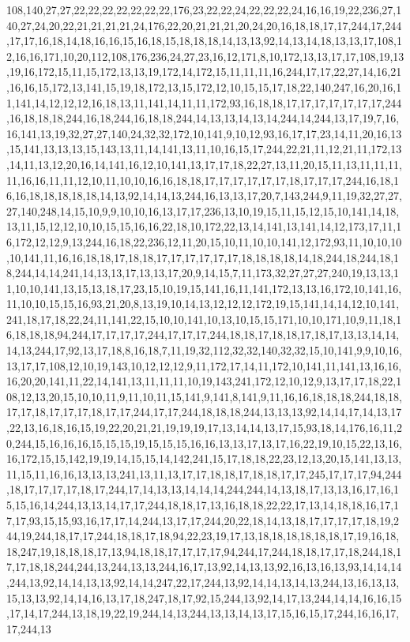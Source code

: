108,140,27,27,22,22,22,22,22,22,22,176,23,22,22,24,22,22,22,24,16,16,19,22,236,27,140,27,24,20,22,21,21,21,21,24,176,22,20,21,21,21,20,24,20,16,18,18,17,17,244,17,244,17,17,16,18,14,18,16,16,15,16,18,15,18,18,18,14,13,13,92,14,13,14,18,13,13,17,108,12,16,16,171,10,20,112,108,176,236,24,27,23,16,12,171,8,10,172,13,13,17,17,108,19,13,19,16,172,15,11,15,172,13,13,19,172,14,172,15,11,11,11,16,244,17,17,22,27,14,16,21,16,16,15,172,13,141,15,19,18,172,13,15,172,12,10,15,15,17,18,22,140,247,16,20,16,11,141,14,12,12,12,16,18,13,11,141,14,11,11,172,93,16,18,18,17,17,17,17,17,17,17,244,16,18,18,18,244,16,18,244,16,18,18,244,14,13,13,14,13,14,244,14,244,13,17,19,7,16,16,141,13,19,32,27,27,140,24,32,32,172,10,141,9,10,12,93,16,17,17,23,14,11,20,16,13,15,141,13,13,13,15,143,13,11,14,141,13,11,10,16,15,17,244,22,21,11,12,21,11,172,13,14,11,13,12,20,16,14,141,16,12,10,141,13,17,17,18,22,27,13,11,20,15,11,13,11,11,11,11,16,16,11,11,12,10,11,10,10,16,16,18,18,17,17,17,17,17,17,18,17,17,17,244,16,18,16,16,18,18,18,18,18,14,13,92,14,14,13,244,16,13,13,17,20,7,143,244,9,11,19,32,27,27,27,140,248,14,15,10,9,9,10,10,16,13,17,17,236,13,10,19,15,11,15,12,15,10,141,14,18,13,11,15,12,12,10,10,15,15,16,16,22,18,10,172,22,13,14,141,13,141,14,12,173,17,11,16,172,12,12,9,13,244,16,18,22,236,12,11,20,15,10,11,10,10,141,12,172,93,11,10,10,10,10,141,11,16,16,18,18,17,18,18,17,17,17,17,17,17,18,18,18,18,14,18,244,18,244,18,18,244,14,14,241,14,13,13,17,13,13,17,20,9,14,15,7,11,173,32,27,27,27,240,19,13,13,11,10,10,141,13,15,13,18,17,23,15,10,19,15,141,16,11,141,172,13,13,16,172,10,141,16,11,10,10,15,15,16,93,21,20,8,13,19,10,14,13,12,12,12,172,19,15,141,14,14,12,10,141,241,18,17,18,22,24,11,141,22,15,10,10,141,10,13,10,15,15,171,10,10,171,10,9,11,18,16,18,18,18,94,244,17,17,17,17,244,17,17,17,244,18,18,17,18,18,17,18,17,13,13,14,14,14,13,244,17,92,13,17,18,8,16,18,7,11,19,32,112,32,32,140,32,32,15,10,141,9,9,10,16,13,17,17,108,12,10,19,143,10,12,12,12,9,11,172,17,14,11,172,10,141,11,141,13,16,16,16,20,20,141,11,22,14,141,13,11,11,11,10,19,143,241,172,12,10,12,9,13,17,17,18,22,108,12,13,20,15,10,10,11,9,11,10,11,15,141,9,141,8,141,9,11,16,16,18,18,18,244,18,18,17,17,18,17,17,17,18,17,17,244,17,17,244,18,18,18,244,13,13,13,92,14,14,17,14,13,17,22,13,16,18,16,15,19,22,20,21,21,19,19,19,17,13,14,14,13,17,15,93,18,14,176,16,11,20,244,15,16,16,16,15,15,15,19,15,15,15,16,16,13,13,17,13,17,16,22,19,10,15,22,13,16,16,172,15,15,142,19,19,14,15,15,14,142,241,15,17,18,18,22,23,12,13,20,15,141,13,13,11,15,11,16,16,13,13,13,241,13,11,13,17,17,18,18,17,18,18,17,17,245,17,17,17,94,244,18,17,17,17,17,18,17,244,17,14,13,13,14,14,14,244,244,14,13,18,17,13,13,16,17,16,15,15,16,14,244,13,13,14,17,17,244,18,18,17,13,16,18,18,22,22,17,13,14,18,18,16,17,17,17,93,15,15,93,16,17,17,14,244,13,17,17,244,20,22,18,14,13,18,17,17,17,17,18,19,244,19,244,18,17,17,244,18,18,17,18,94,22,23,19,17,13,18,18,18,18,18,18,17,19,16,18,18,247,19,18,18,18,17,13,94,18,18,17,17,17,17,94,244,17,244,18,18,17,17,18,244,18,17,17,18,18,244,244,13,244,13,13,244,16,17,13,92,14,13,13,92,16,13,16,13,93,14,14,14,244,13,92,14,14,13,13,92,14,14,247,22,17,244,13,92,14,14,13,14,13,244,13,16,13,13,15,13,13,92,14,14,16,13,17,18,247,18,17,92,15,244,13,92,14,17,13,244,14,14,16,16,15,17,14,17,244,13,18,19,22,19,244,14,13,244,13,13,14,13,17,15,16,15,17,244,16,16,17,17,244,13